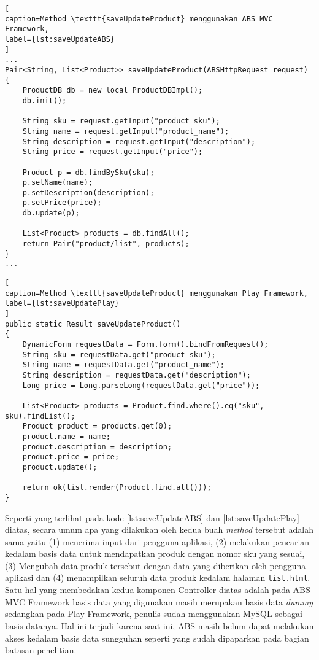 \begin{lstlisting}[
caption=Method \texttt{saveUpdateProduct} menggunakan ABS MVC Framework,
label={lst:saveUpdateABS}
]
...
Pair<String, List<Product>> saveUpdateProduct(ABSHttpRequest request)
{
	ProductDB db = new local ProductDBImpl();
	db.init();
	
	String sku = request.getInput("product_sku");
	String name = request.getInput("product_name");
	String description = request.getInput("description");
	String price = request.getInput("price");
	
	Product p = db.findBySku(sku);
	p.setName(name);
	p.setDescription(description);
	p.setPrice(price);
	db.update(p);
	
	List<Product> products = db.findAll();
	return Pair("product/list", products);
}
...
\end{lstlisting}

\begin{lstlisting}[
caption=Method \texttt{saveUpdateProduct} menggunakan Play Framework,
label={lst:saveUpdatePlay}
]
public static Result saveUpdateProduct()
{
    DynamicForm requestData = Form.form().bindFromRequest();
    String sku = requestData.get("product_sku");
    String name = requestData.get("product_name");
    String description = requestData.get("description");
    Long price = Long.parseLong(requestData.get("price"));

    List<Product> products = Product.find.where().eq("sku", sku).findList();
    Product product = products.get(0);
    product.name = name;
    product.description = description;
    product.price = price;
    product.update();

    return ok(list.render(Product.find.all()));
}
\end{lstlisting}

Seperti yang terlihat pada kode \ref{lst:saveUpdateABS} dan \ref{lst:saveUpdatePlay} diatas, secara umum apa yang dilakukan oleh kedua buah \textit{method} tersebut adalah sama yaitu (1) menerima input dari pengguna aplikasi, (2) melakukan pencarian kedalam basis data untuk mendapatkan produk dengan nomor sku yang sesuai, (3) Mengubah data produk tersebut dengan data yang diberikan oleh pengguna aplikasi dan (4) menampilkan seluruh data produk kedalam halaman \texttt{list.html}. Satu hal yang membedakan kedua komponen Controller diatas adalah pada ABS MVC Framework basis data yang digunakan masih merupakan basis data \textit{dummy} sedangkan pada Play Framework, penulis sudah menggunakan MySQL sebagai basis datanya. Hal ini terjadi karena saat ini, ABS masih belum dapat melakukan akses kedalam basis data sungguhan seperti yang sudah dipaparkan pada bagian batasan penelitian.\\

